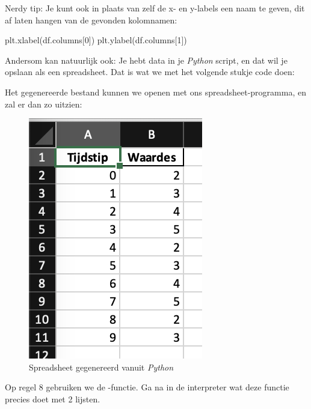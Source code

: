 \begin{remark}
Nerdy tip: Je kunt ook in plaats van zelf de x- en y-labels een naam te geven, dit af laten hangen van de gevonden kolomnamen:
\begin{python}
plt.xlabel(df.columns[0])
plt.ylabel(df.columns[1])
\end{python}
\end{remark}

Andersom kan natuurlijk ook: Je hebt data in je \textit{Python} script, en dat wil je opslaan als een spreadsheet. Dat is wat we met het volgende stukje code doen:


Het gegenereerde bestand kunnen we openen met ons spreadsheet-programma, en zal er dan zo uitzien:

\begin{figure}[h!]
\centering\includegraphics[scale=0.7]{Pictures/chapter07/excel2.png}
\caption{Spreadsheet gegenereerd vanuit \textit{Python}}
\label{fig:excel1} %
\end{figure}

\begin{exercise}
Op regel $8$ gebruiken we de -functie. Ga na in de interpreter wat deze functie precies doet met 2 lijsten. 
\end{exercise}

\newpage

